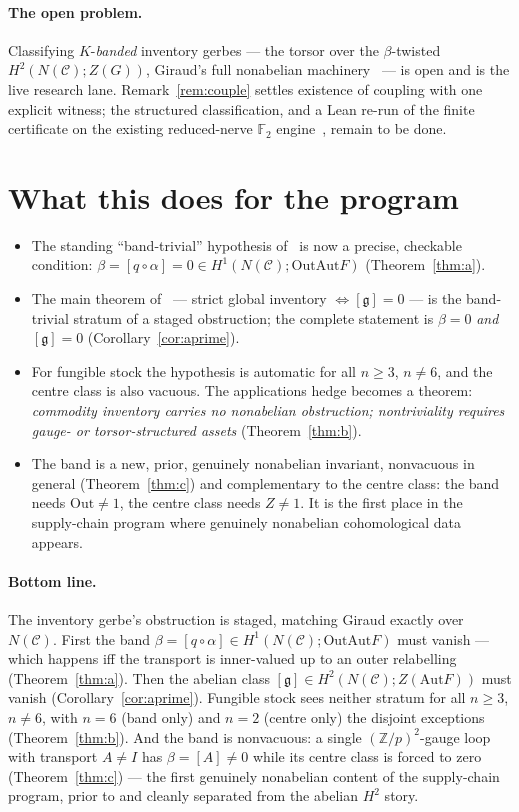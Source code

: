 \documentclass[11pt]{article}
\theoremstyle{definition}
\newcommand{\C}{\mathcal{C}}
\newcommand{\Z}{\mathbb{Z}}
\newcommand{\Aut}{\mathrm{Aut}}
\newcommand{\Out}{\mathrm{Out}}
\newcommand{\gerbe}{\mathfrak{g}}
\begin{document}
\paragraph{The open problem.} Classifying $K$-\emph{banded} inventory gerbes --- the torsor over the
$\beta$-twisted $H^2(N(\C);Z(G))$, Giraud's full nonabelian machinery~\cite{giraud,breen} --- is open
and is the live research lane. Remark~\ref{rem:couple} settles existence of coupling with one explicit
witness; the structured classification, and a Lean re-run of the finite certificate on the existing
reduced-nerve $\mathbb F_2$ engine~\cite{leanwit}, remain to be done.

\section{What this does for the program}\label{sec:prog}

\begin{itemize}
\item The standing ``band-trivial'' hypothesis of~\cite{gerbenote} is now a precise, checkable
condition: $\beta=[q\circ\alpha]=0\in H^1(N(\C);\Out\Aut F)$ (Theorem~\ref{thm:a}).
\item The main theorem of~\cite{gerbenote} --- strict global inventory $\iff[\gerbe]=0$ --- is the
band-trivial stratum of a staged obstruction; the complete statement is $\beta=0$ \emph{and}
$[\gerbe]=0$ (Corollary~\ref{cor:aprime}).
\item For fungible stock the hypothesis is automatic for all $n\ge3$, $n\neq6$, and the centre class is
also vacuous. The applications hedge becomes a theorem: \emph{commodity inventory carries no nonabelian
obstruction; nontriviality requires gauge- or torsor-structured assets} (Theorem~\ref{thm:b}).
\item The band is a new, prior, genuinely nonabelian invariant, nonvacuous in general
(Theorem~\ref{thm:c}) and complementary to the centre class: the band needs $\Out\neq1$, the centre
class needs $Z\neq1$. It is the first place in the supply-chain program where genuinely nonabelian
cohomological data appears.
\end{itemize}

\paragraph{Bottom line.} The inventory gerbe's obstruction is staged, matching Giraud exactly over
$N(\C)$. First the band $\beta=[q\circ\alpha]\in H^1(N(\C);\Out\Aut F)$ must vanish --- which happens
iff the transport is inner-valued up to an outer relabelling (Theorem~\ref{thm:a}). Then the abelian
class $[\gerbe]\in H^2(N(\C);Z(\Aut F))$ must vanish (Corollary~\ref{cor:aprime}). Fungible stock sees
neither stratum for all $n\ge3$, $n\neq6$, with $n=6$ (band only) and $n=2$ (centre only) the disjoint
exceptions (Theorem~\ref{thm:b}). And the band is nonvacuous: a single $(\Z/p)^2$-gauge loop with
transport $A\neq I$ has $\beta=[A]\neq0$ while its centre class is forced to zero
(Theorem~\ref{thm:c}) --- the first genuinely nonabelian content of the supply-chain program, prior to
and cleanly separated from the abelian $H^2$ story.
\end{document}
